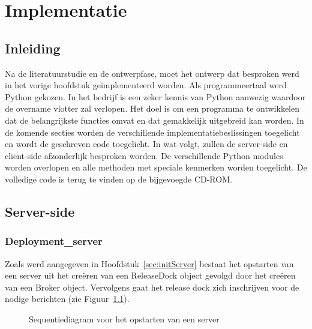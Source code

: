 \chapter{Implementatie}
\section{Inleiding}
Na de literatuurstudie en de ontwerpfase, moet het ontwerp dat besproken werd in het vorige hoofdstuk geïmplementeerd worden.
Als programmeertaal werd Python gekozen.
In het bedrijf is een zeker kennis van Python aanwezig waardoor de overname vlotter zal verlopen.
Het doel is om een programma te ontwikkelen dat de belangrijkste functies omvat en dat gemakkelijk uitgebreid kan worden.
In de komende secties worden de verschillende implementatiebeslissingen toegelicht en wordt de geschreven code toegelicht.
In wat volgt, zullen de server-side en client-side afzonderlijk besproken worden.
De verschillende Python modules worden overlopen en alle methoden met speciale kenmerken worden toegelicht.
De volledige code is terug te vinden op de bijgevoegde CD-ROM.

\section{Server-side}
\subsection{Deployment\_server}
Zoals werd aangegeven in Hoofdstuk~\ref{sec:initServer} bestaat het opstarten van een server uit het creëren van een ReleaseDock object gevolgd door het creëren van een Broker object.
Vervolgens gaat het release dock zich inschrijven voor de nodige berichten (zie Figuur~\ref{fig:seqStartServerNew}).

\begin{figure}[!ht]
\centering
{}
\caption{Sequentiediagram voor het opstarten van een server}
\label{fig:seqStartServerNew}
\end{figure}

